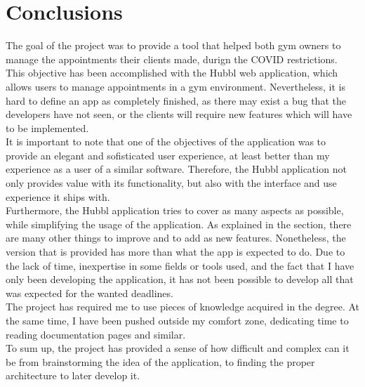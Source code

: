 \documentclass[a4paper, 12pt, oneside]{book}
\begin{document}
\chapter{Conclusions}
The goal of the project was to provide a tool that helped both gym owners to manage the appointments their clients made, durign the COVID restrictions. This objective has been accomplished with the Hubbl web application, which allows users to manage appointments in a gym environment. Nevertheless, it is hard to define an app as completely finished, as there may exist a bug that the developers have not seen, or the clients will require new features which will have to be implemented.
\\[8pt]
It is important to note that one of the objectives of the application was to provide an elegant and sofisticated user experience, at least better than my experience as a user of a similar software. Therefore, the Hubbl application not only provides value with its functionality, but also with the interface and use experience it ships with.
\\[8pt]
Furthermore, the Hubbl application tries to cover as many aspects as possible, while simplifying the usage of the application. As explained in the \emph{} section, there are many other things to improve and to add as new features. Nonetheless, the version that is provided has more than what the app is expected to do. Due to the lack of time, inexpertise in some fields or tools used, and the fact that I have only been developing the application, it has not been possible to develop all that was expected for the wanted deadlines.
\\[8pt]
The project has required me to use pieces of knowledge acquired in the degree. At the same time, I have been pushed outside my comfort zone, dedicating time to reading documentation pages and similar.
\\[8pt]
To sum up, the project has provided a sense of how difficult and complex can it be from brainstorming the idea of the application, to finding the proper architecture to later develop it.
\end{document}
